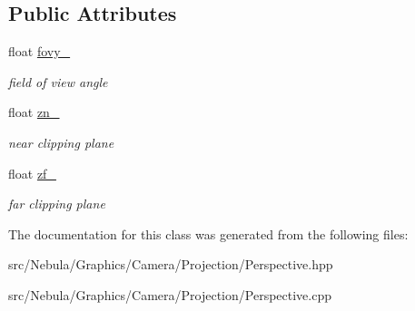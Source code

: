 \subsection*{\-Public \-Attributes}
\begin{DoxyCompactItemize}
\item 
\hypertarget{classglutpp_1_1Camera_1_1Projection_1_1Perspective_adbbd4f2e6c7c1d4028195680bcd88756}{float \hyperlink{classglutpp_1_1Camera_1_1Projection_1_1Perspective_adbbd4f2e6c7c1d4028195680bcd88756}{fovy\-\_\-}}\label{classglutpp_1_1Camera_1_1Projection_1_1Perspective_adbbd4f2e6c7c1d4028195680bcd88756}

\begin{DoxyCompactList}\small\item\em field of view angle \end{DoxyCompactList}\item 
\hypertarget{classglutpp_1_1Camera_1_1Projection_1_1Perspective_a873fea74faea3fcee819e92534b3ea59}{float \hyperlink{classglutpp_1_1Camera_1_1Projection_1_1Perspective_a873fea74faea3fcee819e92534b3ea59}{zn\-\_\-}}\label{classglutpp_1_1Camera_1_1Projection_1_1Perspective_a873fea74faea3fcee819e92534b3ea59}

\begin{DoxyCompactList}\small\item\em near clipping plane \end{DoxyCompactList}\item 
\hypertarget{classglutpp_1_1Camera_1_1Projection_1_1Perspective_aa3301a764cbcc06f9640f982525c2480}{float \hyperlink{classglutpp_1_1Camera_1_1Projection_1_1Perspective_aa3301a764cbcc06f9640f982525c2480}{zf\-\_\-}}\label{classglutpp_1_1Camera_1_1Projection_1_1Perspective_aa3301a764cbcc06f9640f982525c2480}

\begin{DoxyCompactList}\small\item\em far clipping plane \end{DoxyCompactList}\end{DoxyCompactItemize}


\-The documentation for this class was generated from the following files\-:\begin{DoxyCompactItemize}
\item 
src/\-Nebula/\-Graphics/\-Camera/\-Projection/\-Perspective.\-hpp\item 
src/\-Nebula/\-Graphics/\-Camera/\-Projection/\-Perspective.\-cpp\end{DoxyCompactItemize}
